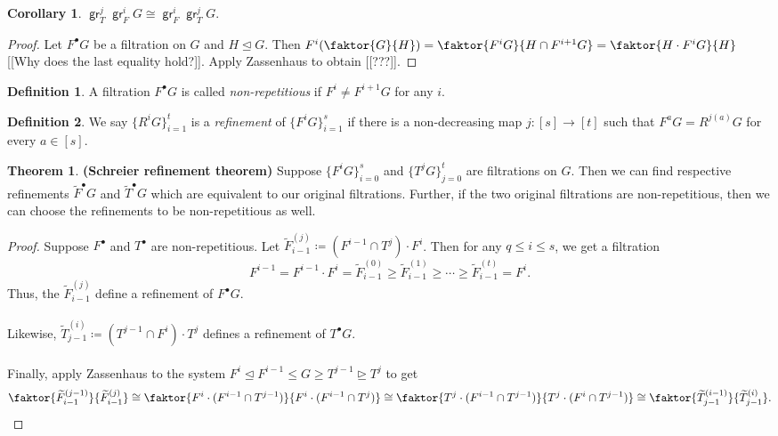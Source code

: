 \documentclass[10pt,letterpaper,cm]{nupset}
\theoremstyle{definition}
\newtheorem*{definition}{Definition}
\newtheorem{theorem}{Theorem}
\newtheorem{corollary}{Corollary}
\newcommand{\1}{\mathbf{1}}
\newcommand{\0}{\vec 0}
\DeclareMathOperator{\gr}{\mathsf{gr}}
\begin{document}
\begin{corollary}
$\gr_T^j\gr_F^iG \cong \gr_F^i \gr_T^j G$.
\end{corollary}
\begin{proof}
Let $F^{\bullet}G$ be a filtration on $G$ and $H \unlhd G$. Then $F^i(\faktor{G}{H}) = \faktor{F^iG}{H \cap F^{i+1}G} = \faktor{H \cdot F^iG}{H}$ {[[Why does the last equality hold?]]}. Apply Zassenhaus to obtain {[[???]]}.
\end{proof}

\begin{definition}
A filtration $F^{\bullet}G$ is called \textit{non-repetitious} if $F^i \ne F^{i+1}G$ for any $i$. 
\end{definition}

\begin{definition}
We say $\{R^iG\}_{i=1}^t$ is a \textit{refinement} of $\{F^iG\}_{i=1}^s$ if there is a non-decreasing map $j : [s] \to [t]$ such that $F^aG = R^{j(a)}G $ for every $a \in [s]$.
\end{definition}

\begin{theorem}{\textbf{(Schreier refinement theorem)}}
Suppose $\{F^iG\}_{i=0}^s$ and $\{T^jG\}_{j=0}^t$ are filtrations on $G$. Then we can find respective refinements $\widetilde{F}^{\bullet}G$ and $\widetilde{T}^{\bullet}G$ which are equivalent to our original filtrations. Further, if the two original filtrations are non-repetitious, then we can choose the refinements to be non-repetitious as well. 
\end{theorem}
\begin{proof}
Suppose $F^{\bullet}$ and $T^{\bullet}$ are non-repetitious. Let $\widetilde{F}_{i-1}^{(j)} \coloneqq  (F^{i-1}\cap T^j) \cdot F^i$. Then for any $q\leq i \leq s$, we get a filtration $$F^{i-1} = F^{i-1}\cdot F^i =\widetilde{F}_{i-1}^{(0)}\geq \widetilde{F}_{i-1}^{(1)}\geq \cdots \geq \widetilde{F}_{i-1}^{(t)} = F^i.$$ Thus, the $\widetilde{F}_{i-1}^{(j)}$ define a refinement of $F^{\bullet}G$. 
\\ \\ Likewise, $\widetilde{T}_{j-1}^{(i)} \coloneqq  (T^{j-1}\cap F^i) \cdot T^j$ defines a refinement of $T^{\bullet}G$.
\\ \\ Finally, apply Zassenhaus to the system $F^i \unlhd F^{i-1} \leq G \geq T^{j-1} \unrhd T^j$ to get
$$\faktor{\widetilde{F}_{i-1}^{(j-1)}}{\widetilde{F}_{i-1}^{(j)}} \cong \faktor{F^i\cdot (F^{i-1} \cap T^{j-1})}{F^i \cdot (F^{i-1} \cap T^j)} \cong \faktor{T^j \cdot (F^{i-1} \cap T^{j-1})}{T^j\cdot (F^i \cap T^{j-1})} \cong   \faktor{\widetilde{T}_{j-1}^{(i-1)}}{\widetilde{T}_{j-1}^{(i)}} .$$
\end{proof}
\end{document}
